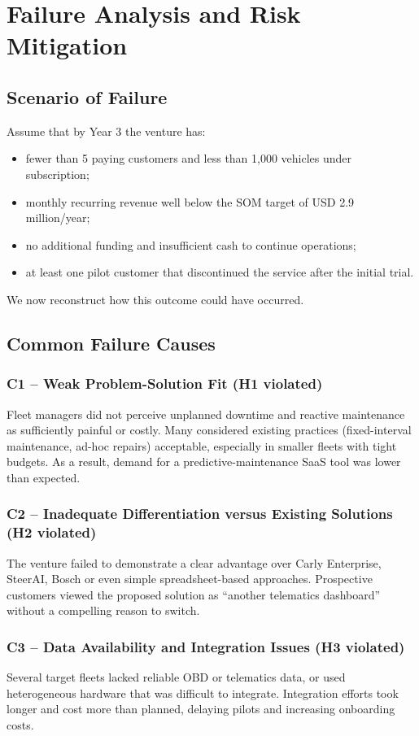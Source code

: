 \documentclass[11pt,a4paper]{article}
\begin{document}
\section{Failure Analysis and Risk Mitigation}
\subsection{Scenario of Failure}
\noindent Assume that by Year 3 the venture has:
\begin{itemize}
    \item fewer than 5 paying customers and less than 1,000 vehicles under subscription;
    \item monthly recurring revenue well below the SOM target of USD 2.9 million/year;
    \item no additional funding and insufficient cash to continue operations;
    \item at least one pilot customer that discontinued the service after the initial trial.
\end{itemize}
\noindent We now reconstruct how this outcome could have occurred.

\subsection{Common Failure Causes}

\subsubsection{C1 -- Weak Problem-Solution Fit (H1 violated)}
\noindent Fleet managers did not perceive unplanned downtime and reactive maintenance as sufficiently painful or costly. Many considered existing practices (fixed-interval maintenance, ad-hoc repairs) acceptable, especially in smaller fleets with tight budgets. As a result, demand for a predictive-maintenance SaaS tool was lower than expected.

\subsubsection{C2 -- Inadequate Differentiation versus Existing Solutions (H2 violated)}
\noindent The venture failed to demonstrate a clear advantage over Carly Enterprise, SteerAI, Bosch or even simple spreadsheet-based approaches. Prospective customers viewed the proposed solution as ``another telematics dashboard'' without a compelling reason to switch.

\subsubsection{C3 -- Data Availability and Integration Issues (H3 violated)}
\noindent Several target fleets lacked reliable OBD or telematics data, or used heterogeneous hardware that was difficult to integrate. Integration efforts took longer and cost more than planned, delaying pilots and increasing onboarding costs.
\end{document}
